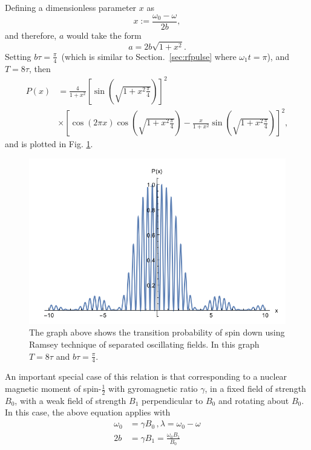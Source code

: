 Defining a dimensionless parameter $x$ as
%
\begin{equation}
x:= \frac{\omega_0 - \omega}{2b} , 
\end{equation}
and therefore, $a$ would take the form 
\begin{equation}
a= 2b \sqrt{1+x^2} .
\end{equation}
Setting $b\tau = \frac{\pi}{4}$~(which is similar to
Section.~\ref{sec:rfpulse} where $\omega_1 t= \pi$), and $T=8\tau$,
then
%
\begin{align}
  P(x) &= \frac{4}{1+x^2} \left[ \sin ( \sqrt{1+x^2 \frac{\pi}{4}}) \right]^2 \\ \nonumber
  & \times
\left[
\cos (2 \pi x) \cos (\sqrt{1+x^2 \frac{\pi}{4}}) - \frac{x}{1+x^2} \sin ( \sqrt{1+x^2 \frac{\pi}{4}}) \right] ^2 ,
\end{align}
%
and is plotted in Fig. \ref{fig:transprob}.
\begin{figure}[h!]
  \centering
  \includegraphics[width=.8\textwidth]{p.png}
  \caption{ The graph above shows the transition probability of spin
    down using Ramsey technique of separated oscillating fields. In
    this graph $T=8\tau$ and $ b \tau = \frac{\pi}{4}$. }
  \label{fig:transprob}
\end{figure}

An important special case of this relation is that corresponding to a
nuclear magnetic moment of spin-$\frac{1}{2}$ with gyromagnetic ratio
$\gamma$, in a fixed field of strength $B_0$, with a weak field of
strength $B_1$ perpendicular to $B_0$ and rotating about $B_0$. In
this case, the above equation applies with
\begin{align}
\omega_0 &= \gamma B_0 \, , \lambda=\omega_0 - \omega \\
2b &= \gamma B_1 =\frac{\omega_0 B_1}{B_0}
\end{align}
